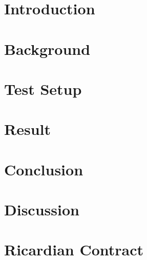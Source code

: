 \documentclass[Nomencl]{DylanMaster}
\begin{document}
\mytitlepage

\newpage

\tableofcontents

\newpage
\section{Introduction}


\newpage
\section{Background}


\newpage
\section{Test Setup}


\newpage
\section{Result}


\newpage
\section{Conclusion}


\newpage
\section{Discussion}


\newpage
\appendix
\section{Ricardian Contract}


\newpage


\end{document}
